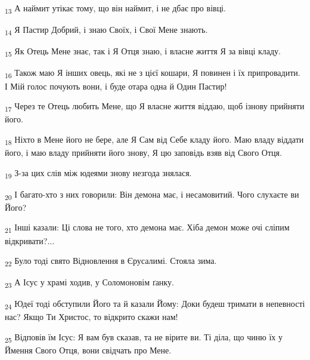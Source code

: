 \begin{tcolorbox}
\textsubscript{13} А наймит утікає тому, що він наймит, і не дбає про вівці.
\end{tcolorbox}
\begin{tcolorbox}
\textsubscript{14} Я Пастир Добрий, і знаю Своїх, і Свої Мене знають.
\end{tcolorbox}
\begin{tcolorbox}
\textsubscript{15} Як Отець Мене знає, так і Я Отця знаю, і власне життя Я за вівці кладу.
\end{tcolorbox}
\begin{tcolorbox}
\textsubscript{16} Також маю Я інших овець, які не з цієї кошари, Я повинен і їх припровадити. І Мій голос почують вони, і буде отара одна й Один Пастир!
\end{tcolorbox}
\begin{tcolorbox}
\textsubscript{17} Через те Отець любить Мене, що Я власне життя віддаю, щоб ізнову прийняти його.
\end{tcolorbox}
\begin{tcolorbox}
\textsubscript{18} Ніхто в Мене його не бере, але Я Сам від Себе кладу його. Маю владу віддати його, і маю владу прийняти його знову, Я цю заповідь взяв від Свого Отця.
\end{tcolorbox}
\begin{tcolorbox}
\textsubscript{19} З-за цих слів між юдеями знову незгода знялася.
\end{tcolorbox}
\begin{tcolorbox}
\textsubscript{20} І багато-хто з них говорили: Він демона має, і несамовитий. Чого слухаєте ви Його?
\end{tcolorbox}
\begin{tcolorbox}
\textsubscript{21} Інші казали: Ці слова не того, хто демона має. Хіба демон може очі сліпим відкривати?...
\end{tcolorbox}
\begin{tcolorbox}
\textsubscript{22} Було тоді свято Відновлення в Єрусалимі. Стояла зима.
\end{tcolorbox}
\begin{tcolorbox}
\textsubscript{23} А Ісус у храмі ходив, у Соломоновім ґанку.
\end{tcolorbox}
\begin{tcolorbox}
\textsubscript{24} Юдеї тоді обступили Його та й казали Йому: Доки будеш тримати в непевності нас? Якщо Ти Христос, то відкрито скажи нам!
\end{tcolorbox}
\begin{tcolorbox}
\textsubscript{25} Відповів їм Ісус: Я вам був сказав, та не вірите ви. Ті діла, що чиню їх у Ймення Свого Отця, вони свідчать про Мене.
\end{tcolorbox}
